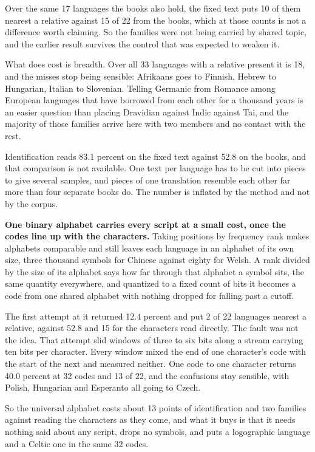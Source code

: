 Over the same 17 languages the books also hold, the fixed text puts 10 of them nearest a relative against 15 of 22 from the books, which at those counts is not a difference worth claiming. So the families were not being carried by shared topic, and the earlier result survives the control that was expected to weaken it.

What does cost is breadth. Over all 33 languages with a relative present it is 18, and the misses stop being sensible: Afrikaans goes to Finnish, Hebrew to Hungarian, Italian to Slovenian. Telling Germanic from Romance among European languages that have borrowed from each other for a thousand years is an easier question than placing Dravidian against Indic against Tai, and the majority of those families arrive here with two members and no contact with the rest.

Identification reads 83.1 percent on the fixed text against 52.8 on the books, and that comparison is not available. One text per language has to be cut into pieces to give several samples, and pieces of one translation resemble each other far more than four separate books do. The number is inflated by the method and not by the corpus.

\textbf{One binary alphabet carries every script at a small cost, once the codes line up with the characters.} Taking positions by frequency rank makes alphabets comparable and still leaves each language in an alphabet of its own size, three thousand symbols for Chinese against eighty for Welsh. A rank divided by the size of its alphabet says how far through that alphabet a symbol sits, the same quantity everywhere, and quantized to a fixed count of bits it becomes a code from one shared alphabet with nothing dropped for falling past a cutoff.

The first attempt at it returned 12.4 percent and put 2 of 22 languages nearest a relative, against 52.8 and 15 for the characters read directly. The fault was not the idea. That attempt slid windows of three to six bits along a stream carrying ten bits per character. Every window mixed the end of one character's code with the start of the next and measured neither. One code to one character returns 40.0 percent at 32 codes and 13 of 22, and the confusions stay sensible, with Polish, Hungarian and Esperanto all going to Czech.

So the universal alphabet costs about 13 points of identification and two families against reading the characters as they come, and what it buys is that it needs nothing said about any script, drops no symbols, and puts a logographic language and a Celtic one in the same 32 codes.

